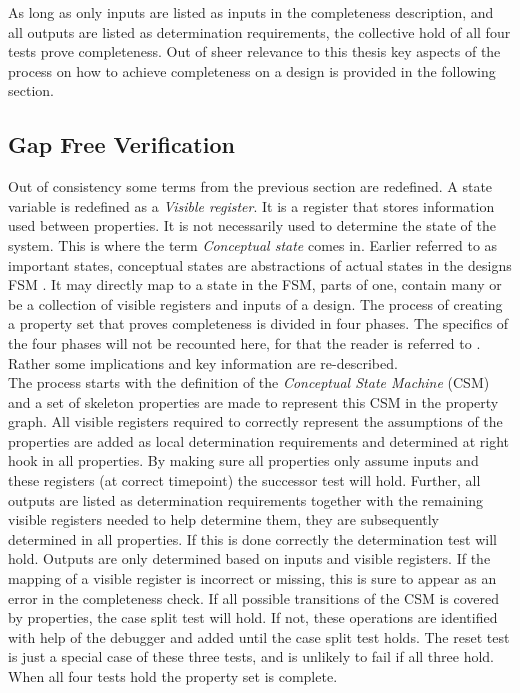 As long as only inputs are listed as inputs in the completeness description, and all outputs are listed as determination requirements, the collective hold of all four tests prove completeness. Out of sheer relevance to this thesis key aspects of the process on how to achieve completeness on a design is provided in the following section. 

\subsection{Gap Free Verification}
\label{subsec:gfv}
Out of consistency some terms from the previous section are redefined. A state variable is redefined as a \textit{Visible register}. It is a register  that stores information used between properties. It is not necessarily used to determine the state of the system. This is where the term \textit{Conceptual state} comes in. Earlier referred to as important states, conceptual states are abstractions of actual states in the designs FSM . It may directly map to a state in the FSM, parts of one,  contain many or be a collection of visible registers and inputs of a design. The process of creating a property set that proves completeness is divided in four phases. The specifics of the four phases will not be recounted here, for that the reader is referred to \cite{gapfree}. Rather some implications and key information are re-described. \\
\newline 
{} 
The process starts with the definition of the \textit{Conceptual State Machine} (CSM) and a set of skeleton properties are made to represent this CSM in the property graph. All visible registers required to correctly represent the assumptions of the properties are added as local determination requirements and determined at right hook in all properties. By making sure all properties only assume inputs and these registers (at correct timepoint) the successor test will hold. Further, all outputs are listed as determination requirements together with the remaining visible registers needed to help determine them, they are subsequently determined in all properties. If this is done correctly the determination test will hold. Outputs are only determined based on inputs and visible registers. If the mapping of a visible register is incorrect or missing, this is sure to appear as an error in the completeness check. If all possible transitions of the CSM is covered by properties, the case split test will hold. If not, these operations are identified with help of the debugger and added until the case split test holds. The reset test is just a special case of these three tests, and is unlikely to fail if all three hold. When all four tests hold the property set is complete. 


